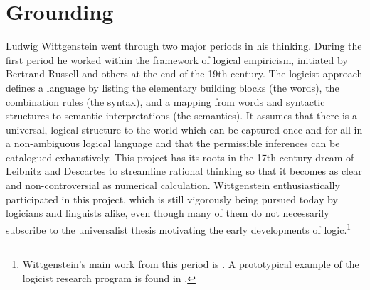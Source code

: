\chapter{Grounding} \label{chap:7}

Ludwig Wittgenstein went through two major 
periods in his thinking. During the first period he worked
within the framework of logical empiricism, initiated by 
Bertrand Russell and others at the end of the 19th century. 
The logicist approach defines a language by listing the 
elementary building blocks (the words), the combination 
rules (the syntax), and a mapping from words and 
syntactic structures to semantic interpretations (the semantics).  
It assumes that there is a universal, logical structure to the
world which can be captured once and for all in a
non-ambiguous logical language 
and that the permissible inferences can be catalogued 
exhaustively. This project has its roots in the 
17th century dream of
Leibnitz and Descartes to streamline rational thinking
so that it becomes as clear and non-controversial as
numerical calculation. 
Wittgenstein enthusiastically participated in this project, 
which is still vigorously being pursued today by logicians 
and linguists alike, even though many of them do not necessarily subscribe
to the universalist thesis motivating the early developments of 
logic.\footnote{Wittgenstein's main work from this period is \cite{Wittgenstein:1922}. 
A prototypical example of the logicist research program 
is found in \cite{Carnap:1928}.}

